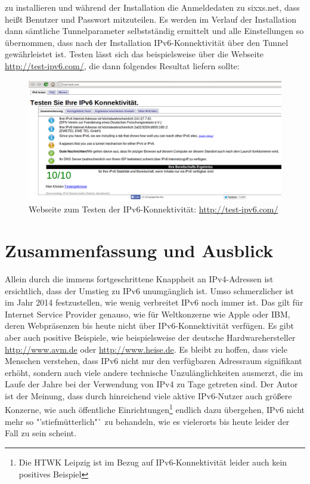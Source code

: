 \documentclass[a4paper,12pt]{scrartcl}
\begin{document}
zu installieren und w\"ahrend der Installation die Anmeldedaten zu sixxs.net, dass hei{\ss}t Benutzer und Passwort mitzuteilen. Es werden im Verlauf der Installation dann s\"amtliche Tunnelparameter selbstst\"andig ermittelt und alle Einstellungen so \"ubernommen, dass nach der Installation IPv6-Konnektivität \"uber den Tunnel gew\"ahrleistet ist. Testen l\"asst sich das beispielsweise \"uber die Webseite \url{http://test-ipv6.com/}, die dann folgendes Resultat liefern sollte:

\begin{figure}[htb]
\begin{center}
 \includegraphics[width=1\hsize]{./images/testipv6.png}
 \end{center}
\caption[Webseite zum Testen der IPv6-Konnektivit\"at: \url{http://test-ipv6.com/}]{\label{testipv6}Webseite zum Testen der IPv6-Konnektivit\"at: \url{http://test-ipv6.com/}}
\end{figure}

\section{Zusammenfassung und Ausblick}
Allein durch die immens fortgeschrittene Knappheit an IPv4-Adressen ist ersichtlich, dass der Umstieg zu IPv6 unumg\"anglich ist. Umso schmerzlicher ist im Jahr 2014 festzustellen, wie wenig verbreitet IPv6 noch immer ist. Das gilt f\"ur Internet Service Provider genauso, wie f\"ur Weltkonzerne wie Apple oder IBM, deren Webpräsenzen bis heute nicht über IPv6-Konnektivit\"at verf\"ugen. Es gibt aber auch positive Beispiele, wie beispielsweise der deutsche Hardwarehersteller \url{http://www.avm.de} oder \url{http://www.heise.de}. Es bleibt zu hoffen, dass viele Menschen verstehen, dass IPv6 nicht nur den verf\"ugbaren Adressraum signifikant erh\"oht, sondern auch viele andere technische Unzul\"anglichkeiten ausmerzt, die im Laufe der Jahre bei der Verwendung von IPv4 zu Tage getreten sind. Der Autor ist der Meinung, dass durch hinreichend viele aktive IPv6-Nutzer auch gr\"o{\ss}ere Konzerne, wie auch \"offentliche Einrichtungen\footnote{Die HTWK Leipzig ist im Bezug auf IPv6-Konnektivit\"at leider auch kein positives Beispiel} endlich dazu \"ubergehen, IPv6 nicht mehr so "'stiefm\"utterlich"` zu behandeln, wie es vielerorts bis heute leider der Fall zu sein scheint. 
\end{document}
